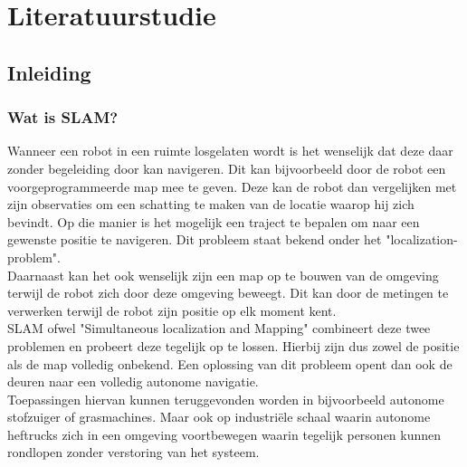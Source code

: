 
\chapter{Literatuurstudie}
\label{hoofdstuk:1}
\section{Inleiding}
\subsection{Wat is SLAM?}
Wanneer een robot in een ruimte losgelaten wordt is het wenselijk dat deze daar zonder begeleiding door kan navigeren. Dit kan bijvoorbeeld door de robot een voorgeprogrammeerde map mee te geven. Deze kan de robot dan vergelijken met zijn observaties om een schatting te maken van de locatie waarop hij zich bevindt. Op die manier is het mogelijk een traject te bepalen om naar een gewenste positie te navigeren.  Dit probleem staat bekend onder het "localization-problem". \\
Daarnaast kan het ook wenselijk zijn een map op te bouwen van de omgeving terwijl de robot zich door deze omgeving beweegt. Dit kan door de metingen te verwerken terwijl de robot zijn positie op elk moment kent. \\
SLAM ofwel "Simultaneous localization and Mapping" combineert deze twee problemen en probeert deze tegelijk op te lossen. Hierbij zijn dus zowel de positie als de map volledig onbekend. Een oplossing van dit probleem opent dan ook de deuren naar een volledig autonome navigatie. \\
Toepassingen hiervan kunnen teruggevonden worden in bijvoorbeeld autonome stofzuiger of grasmachines. Maar ook op industriële schaal waarin autonome heftrucks zich in een omgeving voortbewegen waarin tegelijk personen kunnen rondlopen zonder verstoring van het systeem.\cite{Course}\\

